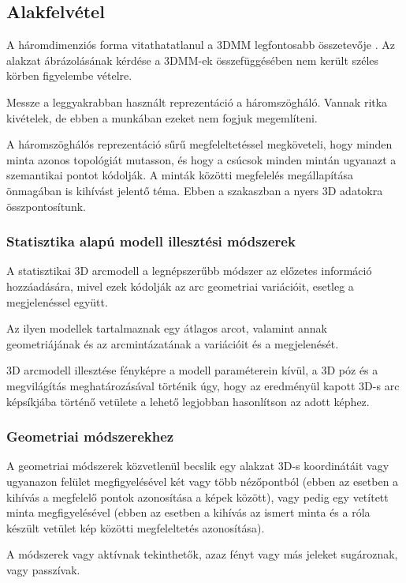 \documentclass[12pt,a4]{article}
\begin{document}
	 \subsection{Alakfelvétel}
	 A háromdimenziós forma vitathatatlanul a 3DMM legfontosabb összetevője \cite{3dmm}. Az alakzat ábrázolásának kérdése
	 a 3DMM-ek összefüggésében nem került széles körben figyelembe vételre.
	 
	  Messze a
	 leggyakrabban használt reprezentáció a háromszögháló. Vannak ritka kivételek, de ebben a munkában ezeket nem fogjuk megemlíteni.
	 
	  A háromszöghálós reprezentáció sűrű megfeleltetéssel megköveteli, hogy minden minta azonos topológiát mutasson, és hogy a csúcsok minden mintán ugyanazt a szemantikai pontot kódolják. A minták közötti megfelelés megállapítása önmagában is kihívást jelentő téma. Ebben a szakaszban a nyers 3D adatokra összpontosítunk.
	
	
	\subsubsection{Statisztika alapú modell illesztési módszerek}
	A statisztikai 3D arcmodell \cite{survey} a legnépszerűbb módszer az előzetes információ hozzáadására, mivel ezek kódolják az arc geometriai variációit, esetleg a megjelenéssel együtt.
	
	 Az ilyen modellek tartalmaznak egy átlagos arcot, valamint annak geometriájának és az arcmintázatának a variációit és a megjelenését.
	 
	  3D arcmodell illesztése fényképre
	a modell paraméterein kívül,
	a 3D póz és a megvilágítás meghatározásával történik úgy, hogy
	az eredményül kapott 3D-s arc képsíkjába történő vetülete
	a lehető legjobban hasonlítson az adott képhez.
	
	\subsubsection{Geometriai módszerekhez}
	A geometriai módszerek \cite{3dmm} közvetlenül becslik egy alakzat 3D-s koordinátáit vagy ugyanazon felület megfigyelésével
	két vagy több nézőpontból (ebben az esetben a kihívás a megfelelő pontok azonosítása a képek között), vagy pedig egy vetített minta megfigyelésével (ebben az esetben a kihívás az ismert minta és a róla készült vetület kép közötti megfeleltetés azonosítása).
	
	 A módszerek vagy aktívnak tekinthetők, azaz fényt
	vagy más jeleket sugároznak, vagy passzívak.
	
\end{document}
